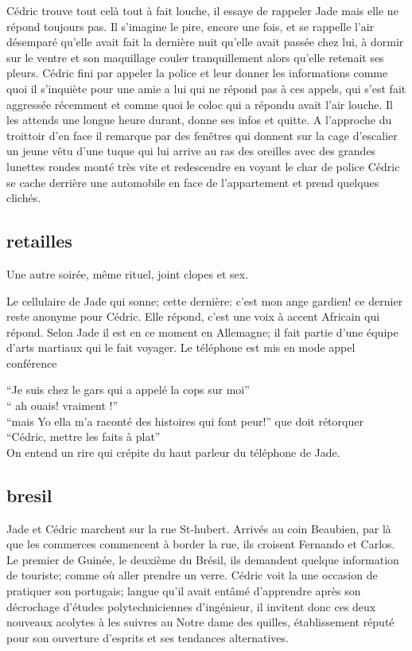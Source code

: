 \documentclass{article}
\begin{document}
Cédric trouve tout celà tout à fait louche, il essaye de rappeler Jade mais elle
ne répond toujours pas. Il s'imagine le pire, encore une fois, et se rappelle
l'air désemparé qu'elle avait fait la dernière nuit qu'elle avait passée chez
lui, à dormir sur le ventre et son maquillage couler tranquillement alors
qu'elle retenait ses pleurs. Cédric fini par appeler la police et leur donner
les informations comme quoi il s'inquiète pour une amie a lui qui ne répond pas
à ces appels, qui s'est fait aggressée récemment et comme quoi le coloc qui a
répondu avait l'air louche. Il les attends une longue heure durant, donne ses
infos et quitte. A l'approche du troittoir d'en face il remarque par des
fenêtres qui donnent sur la cage d'escalier un jeune vêtu d'une tuque qui lui
arrive au ras des oreilles avec des grandes lunettes rondes monté très vite et
redescendre en voyant le char de police Cédric se cache derrière une automobile
en face de l'appartement et prend quelques clichés.\\


\clearpage
\subsection{retailles}

Une autre soirée, même rituel, joint clopes et sex.

Le cellulaire de Jade qui sonne; cette dernière: c'est mon ange gardien!
ce dernier reste anonyme pour Cédric. Elle répond, c'est une voix à accent
Africain qui répond. Selon Jade il est en ce moment en Allemagne; il fait partie
d'une équipe d'arts martiaux qui le fait voyager. Le téléphone est mis en mode
appel conférence

``Je suis chez le gars qui a appelé la cops sur moi''\\
`` ah ouais! vraiment !''\\
``mais Yo ella m'a raconté des histoires qui font peur!''  que doit rétorquer\\
``Cédric, mettre les faits à plat''\\
On entend un rire qui crépite du haut parleur du téléphone de Jade.

\clearpage

\subsection{bresil}

Jade et Cédric marchent sur la rue St-hubert. Arrivés au coin Beaubien, par là
que les commerces commencent à border la rue, ils croisent Fernando et Carlos.
Le premier de Guinée, le deuxième du Brésil, ils demandent quelque information
de touriste; comme où aller prendre un verre. Cédric voit la une occasion de
pratiquer son portugais; langue qu'il avait entâmé d'apprendre après son
décrochage d'études polytechniciennes d'ingénieur, il invitent donc ces deux
nouveaux acolytes à les suivres au Notre dame des quilles, établissement réputé
pour son ouverture d'esprits et ses tendances alternatives.\\
\end{document}

